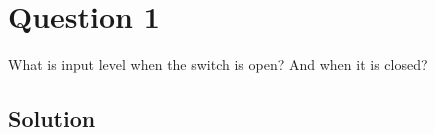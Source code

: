 \section*{Question 1}

What is input level when the switch is open?
And when it is closed?

\subsection*{Solution}
